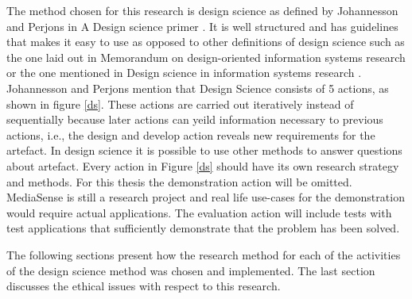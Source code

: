 The method chosen for this research is design science as defined by Johannesson and Perjons in A Design science primer \cite{johannesson2012design}. It is well structured and has guidelines that makes it easy to use as opposed to other definitions of design science such as the one laid out in Memorandum on design-oriented information systems research \cite{osterle2010memorandum} or the one mentioned in Design science in information systems research \cite{hevner2004design}. Johannesson and Perjons mention that Design Science consists of 5 actions, as shown in figure \ref{ds}. These actions are carried out iteratively instead of sequentially because later actions can yeild information necessary to previous actions, i.e., the design and develop action reveals new requirements for the artefact. In design science it is possible to use other methods to answer questions about artefact. Every action in Figure \ref{ds} should have its own research strategy and methods. For this thesis the demonstration action will be omitted. MediaSense is still a research project and real life use-cases for the demonstration would require actual applications. The evaluation action will include tests with test applications that sufficiently demonstrate that the problem has been solved.

The following sections present how the research method for each of the activities of the design science method was chosen and implemented. The last section discusses the ethical issues with respect to this research.






